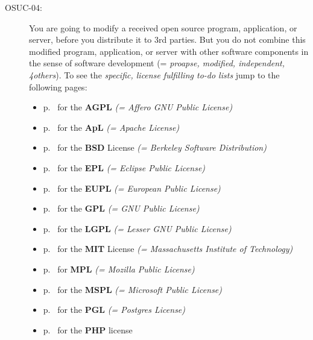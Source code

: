 \begin{description}
\item[OSUC-04:]\label{OSUC-04-DEF} You are going to modify a received open
source program, application, or server, before you distribute it to 3rd parties.
But you do not combine this modified program, application, or server with other
software components in the sense of software development (= \textit{proapse,
modified, independent, 4others}).
To see the \textit{specific, license fulfilling to-do lists} jump to the
following pages:
  \begin{itemize}
    \item p.\ \pageref{OSUC-04-AGPL} for the \textbf{AGPL}
      \textit{(= Affero GNU Public License)} 
    \item p.\ \pageref{OSUC-04-Apache20} for the \textbf{ApL}
      \textit{(= Apache License)}
    \item p.\ \pageref{OSUC-04-BSD} for the \textbf{BSD} License
      \textit{(= Berkeley Software Distribution)}
    \item p.\ \pageref{OSUC-04-EPL} for the \textbf{EPL}
      \textit{(= Eclipse Public License)}     
    \item p.\ \pageref{OSUC-04-EUPL} for the \textbf{EUPL}
      \textit{(= European Public License)} 
    \item p.\ \pageref{OSUC-04-GPL} for the \textbf{GPL}
       \textit{(= GNU Public License)} 
    \item p.\ \pageref{OSUC-04-LGPL} for the \textbf{LGPL}
      \textit{(= Lesser GNU Public License)}           
    \item p.\ \pageref{OSUC-04-MIT} for the \textbf{MIT} License
       \textit{(= Massachusetts Institute of Technology)} 
    \item p.\ \pageref{OSUC-04-MPL} for \textbf{MPL}
      \textit{(= Mozilla Public License)}     
    \item p.\ \pageref{OSUC-04-MsPL} for the \textbf{MSPL}
      \textit{(= Microsoft Public License)} 
    \item p.\ \pageref{OSUC-04-PGL} for the \textbf{PGL}
      \textit{(= Postgres License)} 
    \item p.\ \pageref{OSUC-04-PHP} for the \textbf{PHP} license 
  \end{itemize}


\end{description}
